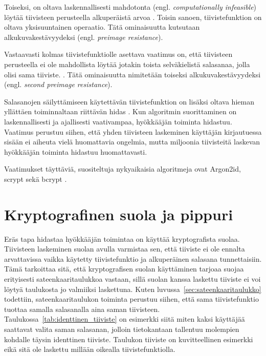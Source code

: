 Toiseksi, on oltava laskennallisesti mahdotonta (engl. \textit{computationally infeasible}) löytää tiivisteen perusteella alkuperäistä arvoa \citep{dang_recommendation_2012}. Toisin sanoen, tiivistefunktion on oltava yksisuuntainen operaatio. Tätä ominaisuutta kutsutaan alkukuvakestävyydeksi (engl. \textit{preimage resistance}).

Vastaavasti kolmas tiivistefunktiolle asettava vaatimus on, että tiivisteen perusteella ei ole mahdollista löytää jotakin toista selväkielistä salasanaa, jolla olisi sama tiiviste. \citep{dang_recommendation_2012}. Tätä ominaisuutta nimitetään toiseksi alkukuvakestävyydeksi (engl. \textit{second preimage resistance}).

Salasanojen säilyttämiseen käytettävän tiivistefunktion on lisäksi oltava hieman yllättäen toiminnaltaan riittävän hidas \citep{owasp_storage_2023}. Kun algoritmin suorittaminen on laskennallisesti ja ajallisesti vaativampaa, hyökkääjän toiminta hidastuu. Vaatimus perustuu siihen, että yhden tiivisteen laskeminen käyttäjän kirjautuessa sisään ei aiheuta vielä huomattavia ongelmia, mutta miljoonia tiivisteitä laskevan hyökkääjän toiminta hidastuu huomattavasti.

Vaatimukset täyttäviä, suositeltuja nykyaikaisia algoritmeja ovat Argon2id, scrypt sekä bcrypt \citep{owasp_storage_2023}.

\section{Kryptografinen suola ja pippuri\label{sec:kryptografinen_suola}}

Eräs tapa hidastaa hyökkääjän toimintaa on käyttää kryptografista suolaa. Tiivisteen laskeminen suolan avulla varmistaa sen, että tiiviste ei ole ennalta arvattavissa vaikka käytetty tiivistefunktio ja alkuperäinen salasana tunnettaisiin. Tämä tarkoittaa sitä, että kryptografisen suolan käyttäminen tarjoaa suojaa erityisesti sateenkaaritaulukkoa vastaan, sillä suolan kanssa laskettu tiiviste ei voi löytyä taulukosta jo valmiiksi laskettuna. Kuten luvussa~\ref{sec:sateenkaaritaulukko} todettiin, sateenkaaritaulukon toiminta perustuu siihen, että sama tiivistefunktio tuottaa samalla salasanalla aina saman tiivisteen. Taulukossa~\ref{tab:identtinen_tiiviste} on esimerkki siitä miten kaksi käyttäjää saattavat valita saman salasanan, jolloin tietokantaan tallentuu molempien kohdalle täysin identtinen tiiviste. Taulukon tiiviste on kuvitteellinen esimerkki eikä sitä ole laskettu millään oikealla tiivistefunktiolla.

